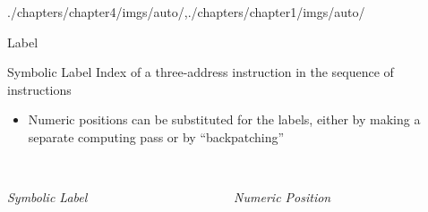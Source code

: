 \begin{graphicspathcontext}{{./chapters/chapter4/imgs/auto/},{./chapters/chapter1/imgs/auto/}}
\begin{bibunit}[apalike]
\begin{frame}[background=6]{Label}
	\begin{definitionblock}{Symbolic Label}
		Index of a three-address instruction in the sequence of instructions
	\end{definitionblock}
	\begin{itemize}
	\item Numeric positions can be substituted for the labels, either by making a separate computing pass or by ``backpatching''
	\end{itemize}
	\begin{columns}
		\begin{column}{.4\linewidth}
			\begin{center}
			\begin{tac}[\linewidth]
			\end{tac} \\[1em]
			\emph{Symbolic Label}
			\end{center}
		\end{column}
		\begin{column}{.5\linewidth}
			\begin{center}
			\begin{tac}[\linewidth]
			\end{tac} \\[1em]
			\emph{Numeric Position}
			\end{center}
		\end{column}
	\end{columns}
\end{frame}


\end{bibunit}
\end{graphicspathcontext}
